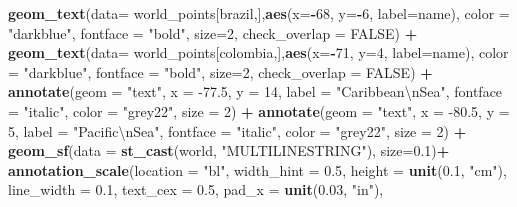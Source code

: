 \documentclass[12pt,oneside]{reedthesis}
\newenvironment{Shaded}{\begin{snugshade}}{\end{snugshade}}
\newcommand{\CharTok}[1]{\textcolor[rgb]{0.31,0.60,0.02}{#1}}
\newcommand{\DataTypeTok}[1]{\textcolor[rgb]{0.13,0.29,0.53}{#1}}
\newcommand{\DecValTok}[1]{\textcolor[rgb]{0.00,0.00,0.81}{#1}}
\newcommand{\FloatTok}[1]{\textcolor[rgb]{0.00,0.00,0.81}{#1}}
\newcommand{\KeywordTok}[1]{\textcolor[rgb]{0.13,0.29,0.53}{\textbf{#1}}}
\newcommand{\NormalTok}[1]{#1}
\newcommand{\OperatorTok}[1]{\textcolor[rgb]{0.81,0.36,0.00}{\textbf{#1}}}
\newcommand{\OtherTok}[1]{\textcolor[rgb]{0.56,0.35,0.01}{#1}}
\newcommand{\StringTok}[1]{\textcolor[rgb]{0.31,0.60,0.02}{#1}}
\begin{document}
\begin{Shaded}
\begin{Highlighting}[]
\StringTok{  }\KeywordTok{geom_text}\NormalTok{(}\DataTypeTok{data=}\NormalTok{ world_points[brazil,],}\KeywordTok{aes}\NormalTok{(}\DataTypeTok{x=}\OperatorTok{-}\DecValTok{68}\NormalTok{, }\DataTypeTok{y=}\OperatorTok{-}\DecValTok{6}\NormalTok{, }\DataTypeTok{label=}\NormalTok{name), }\DataTypeTok{color =} \StringTok{"darkblue"}\NormalTok{, }\DataTypeTok{fontface =} \StringTok{"bold"}\NormalTok{, }\DataTypeTok{size=}\DecValTok{2}\NormalTok{, }\DataTypeTok{check_overlap =} \OtherTok{FALSE}\NormalTok{) }\OperatorTok{+}
\StringTok{  }\KeywordTok{geom_text}\NormalTok{(}\DataTypeTok{data=}\NormalTok{ world_points[colombia,],}\KeywordTok{aes}\NormalTok{(}\DataTypeTok{x=}\OperatorTok{-}\DecValTok{71}\NormalTok{, }\DataTypeTok{y=}\DecValTok{4}\NormalTok{, }\DataTypeTok{label=}\NormalTok{name), }\DataTypeTok{color =} \StringTok{"darkblue"}\NormalTok{, }\DataTypeTok{fontface =} \StringTok{"bold"}\NormalTok{, }\DataTypeTok{size=}\DecValTok{2}\NormalTok{, }\DataTypeTok{check_overlap =} \OtherTok{FALSE}\NormalTok{) }\OperatorTok{+}
\StringTok{  }\KeywordTok{annotate}\NormalTok{(}\DataTypeTok{geom =} \StringTok{"text"}\NormalTok{, }\DataTypeTok{x =} \FloatTok{-77.5}\NormalTok{, }\DataTypeTok{y =} \DecValTok{14}\NormalTok{, }\DataTypeTok{label =} \StringTok{"Caribbean}\CharTok{\textbackslash{}n}\StringTok{Sea"}\NormalTok{, }\DataTypeTok{fontface =} \StringTok{"italic"}\NormalTok{, }\DataTypeTok{color =} \StringTok{"grey22"}\NormalTok{, }\DataTypeTok{size =} \DecValTok{2}\NormalTok{) }\OperatorTok{+}\StringTok{ }
\StringTok{  }\KeywordTok{annotate}\NormalTok{(}\DataTypeTok{geom =} \StringTok{"text"}\NormalTok{, }\DataTypeTok{x =} \FloatTok{-80.5}\NormalTok{, }\DataTypeTok{y =} \DecValTok{5}\NormalTok{, }\DataTypeTok{label =} \StringTok{"Pacific}\CharTok{\textbackslash{}n}\StringTok{Sea"}\NormalTok{, }\DataTypeTok{fontface =} \StringTok{"italic"}\NormalTok{, }\DataTypeTok{color =} \StringTok{"grey22"}\NormalTok{, }\DataTypeTok{size =} \DecValTok{2}\NormalTok{) }\OperatorTok{+}
\StringTok{  }\KeywordTok{geom_sf}\NormalTok{(}\DataTypeTok{data =} \KeywordTok{st_cast}\NormalTok{(world, }\StringTok{"MULTILINESTRING"}\NormalTok{), }\DataTypeTok{size=}\FloatTok{0.1}\NormalTok{)}\OperatorTok{+}
\StringTok{  }\KeywordTok{annotation_scale}\NormalTok{(}\DataTypeTok{location =} \StringTok{"bl"}\NormalTok{, }\DataTypeTok{width_hint =} \FloatTok{0.5}\NormalTok{, }\DataTypeTok{height =} \KeywordTok{unit}\NormalTok{(}\FloatTok{0.1}\NormalTok{, }\StringTok{"cm"}\NormalTok{), }\DataTypeTok{line_width =} \FloatTok{0.1}\NormalTok{, }\DataTypeTok{text_cex =} \FloatTok{0.5}\NormalTok{, }\DataTypeTok{pad_x =} \KeywordTok{unit}\NormalTok{(}\FloatTok{0.03}\NormalTok{, }\StringTok{"in"}\NormalTok{), }

\end{Highlighting}
\end{Shaded}
\end{document}
